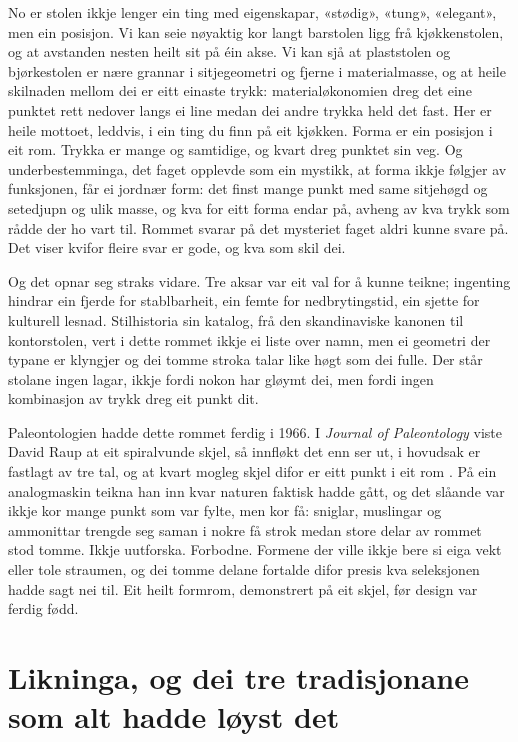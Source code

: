 No er stolen ikkje lenger ein ting med eigenskapar, «stødig», «tung», «elegant», men ein posisjon. Vi kan seie nøyaktig kor langt barstolen ligg frå kjøkkenstolen, og at avstanden nesten heilt sit på éin akse. Vi kan sjå at plaststolen og bjørkestolen er nære grannar i sitjegeometri og fjerne i materialmasse, og at heile skilnaden mellom dei er eitt einaste trykk: materialøkonomien dreg det eine punktet rett nedover langs ei line medan dei andre trykka held det fast. Her er heile mottoet, leddvis, i ein ting du finn på eit kjøkken. Forma er ein posisjon i eit rom. Trykka er mange og samtidige, og kvart dreg punktet sin veg. Og underbestemminga, det faget opplevde som ein mystikk, at forma ikkje følgjer av funksjonen, får ei jordnær form: det finst mange punkt med same sitjehøgd og setedjupn og ulik masse, og kva for eitt forma endar på, avheng av kva trykk som rådde der ho vart til. Rommet svarar på det mysteriet faget aldri kunne svare på. Det viser kvifor fleire svar er gode, og kva som skil dei.

Og det opnar seg straks vidare. Tre aksar var eit val for å kunne teikne; ingenting hindrar ein fjerde for stablbarheit, ein femte for nedbrytingstid, ein sjette for kulturell lesnad. Stilhistoria sin katalog, frå den skandinaviske kanonen til kontorstolen, vert i dette rommet ikkje ei liste over namn, men ei geometri der typane er klyngjer og dei tomme stroka talar like høgt som dei fulle. Der står stolane ingen lagar, ikkje fordi nokon har gløymt dei, men fordi ingen kombinasjon av trykk dreg eit punkt dit.

Paleontologien hadde dette rommet ferdig i 1966. I \textit{Journal of Paleontology} viste David Raup at eit spiralvunde skjel, så innfløkt det enn ser ut, i hovudsak er fastlagt av tre tal, og at kvart mogleg skjel difor er eitt punkt i eit rom \autocite{raup1966}. På ein analogmaskin teikna han inn kvar naturen faktisk hadde gått, og det slåande var ikkje kor mange punkt som var fylte, men kor få: sniglar, muslingar og ammonittar trengde seg saman i nokre få strok medan store delar av rommet stod tomme. Ikkje uutforska. Forbodne. Formene der ville ikkje bere si eiga vekt eller tole straumen, og dei tomme delane fortalde difor presis kva seleksjonen hadde sagt nei til. Eit heilt formrom, demonstrert på eit skjel, før design var ferdig fødd.

\section{Likninga, og dei tre tradisjonane som alt hadde løyst det}


